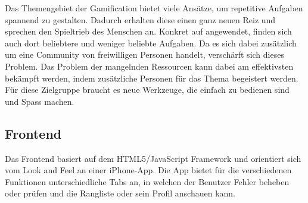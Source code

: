 Das Themengebiet der \gls{Gamification} bietet viele Ansätze, um repetitive Aufgaben spannend zu gestalten.
Dadurch erhalten diese einen ganz neuen Reiz und sprechen den Spieltrieb des Menschen an.
Konkret auf  angewendet, finden sich auch dort beliebtere und weniger beliebte Aufgaben.
Da es sich dabei zusätzlich um eine Community von freiwilligen Personen handelt, verschärft sich dieses Problem.
Das Problem der mangelnden Ressourcen kann dabei am effektivsten bekämpft werden, indem zusätzliche Personen für das Thema begeistert werden.
Für diese Zielgruppe braucht es neue Werkzeuge, die einfach zu bedienen sind und Spass machen.

\subsection*{Frontend}
Das Frontend basiert auf dem HTML5/JavaScript Framework  und orientiert sich vom Look and Feel an einer iPhone-App.
Die App bietet für die verschiedenen Funktionen unterschiedliche Tabs an, in welchen der Benutzer Fehler beheben oder prüfen und die Rangliste oder sein Profil anschauen kann.

